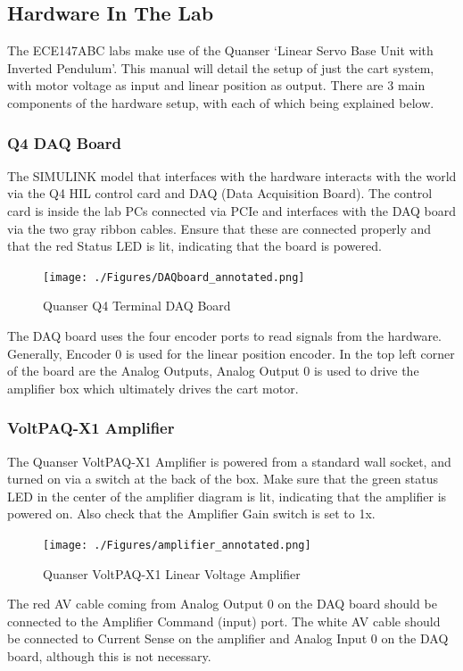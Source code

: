 \documentclass[11pt,letterpaper]{article}
\begin{document}
\subsection{Hardware In The Lab}
The ECE147ABC labs make use of the Quanser `Linear Servo Base Unit with Inverted Pendulum'. This manual will detail the setup of just the cart system, with motor voltage as input and linear position as output. There are 3 main components of the hardware setup, with each of which being explained below.

\subsubsection{Q4 DAQ Board}
The SIMULINK model that interfaces with the hardware interacts with the world via the Q4 HIL control card and DAQ (Data Acquisition Board). The control card is inside the lab PCs connected via PCIe and interfaces with the DAQ board via the two gray ribbon cables. Ensure that these are connected properly and that the red Status LED is lit, indicating that the board is powered.
\begin{figure}[H]
  \centering
  \texttt{[image: ./Figures/DAQboard\_annotated.png]}
  \caption{Quanser Q4 Terminal DAQ Board}
\end{figure}
The DAQ board uses the four encoder ports to read signals from the hardware. Generally, Encoder 0 is used for the linear position encoder. In the top left corner of the board are the Analog Outputs, Analog Output 0 is used to drive the amplifier box which ultimately drives the cart motor.



\subsubsection{VoltPAQ-X1 Amplifier}
The Quanser VoltPAQ-X1 Amplifier is powered from a standard wall socket, and turned on via a switch at the back of the box. Make sure that the green status LED in the center of the amplifier diagram is lit, indicating that the amplifier is powered on. Also check that the Amplifier Gain switch is set to 1x.


\begin{figure}[H]
  \centering
  \texttt{[image: ./Figures/amplifier\_annotated.png]}
  \caption{Quanser VoltPAQ-X1 Linear Voltage Amplifier}
\end{figure}

The red AV cable coming from Analog Output 0 on the DAQ board should be connected to the Amplifier Command (input) port. The white AV cable should be connected to Current Sense on the amplifier and Analog Input 0 on the DAQ board, although this is not necessary. \\
\end{document}
